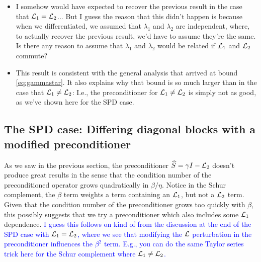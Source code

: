 \documentclass[a4paper,10pt]{article}
\newcommand{\tcb}{\textcolor{blue}}
\begin{document}
{\begin{itemize}
\item I somehow would have expected to recover the previous result in the case  that ${\cal L}_1 = {\cal L}_2$... But I guess the reason that this didn't happen is because when we differentiated, we assumed that $\lambda_1$ and $\lambda_2$ are independent, where, to actually recover the previous result, we'd have to assume they're the same. Is there any reason to assume that $\lambda_1$ and $\lambda_2$ would be related if ${\cal L}_1$ and ${\cal L}_2$ commute?
 
\item This result is consistent with the general analysis that arrived at bound \eqref{eq:gammastar}. It also explains why that bound is so much larger than in the case that ${\cal L}_1 \neq {\cal L}_2$: I.e., the preconditioner for ${\cal L}_1 \neq {\cal L}_2$ is simply not as good, as we've shown here for the SPD case.
 
\end{itemize}


\newpage
\subsection{The SPD case: Differing diagonal blocks with a modified preconditioner}

As we saw in the previous section, the preconditioner $\widehat{S} = \gamma I - {\cal L}_2$ doesn't produce great results in the sense that the condition number of the preconditioned operator grows quadratically in $\beta/\eta$. Notice in the Schur complement, the $\beta$ term weights a term containing an ${\cal L}_1$, but not a ${\cal L}_2$ term. Given that the condition number of the preconditioner grows too quickly with $\beta$, this possibly suggests that we try a preconditioner which also includes some ${\cal L}_1$ dependence. \tcb{I guess this follows on kind of from the discussion at the end of the SPD case with ${\cal L}_1 = {\cal L}_2$, where we see that modifying the ${\cal L}$ perturbation in the preconditioner influences the $\beta^2$ term. E.g., you can do the same Taylor series trick here for the Schur complement where ${\cal L}_1 \neq {\cal L}_2$.}

}
\end{document}
